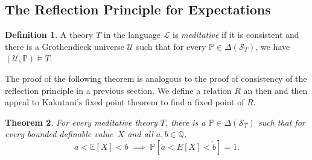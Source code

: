 \documentclass[12pt]{article}
\newcommand{\PP}{\mathbb{P}}
\newcommand{\EE}{\mathbb{E}}
\newcommand{\QQ}{\mathbb{Q}}
\newcommand{\cL}{\mathcal{L}}
\newcommand{\cS}{\mathcal{S}}
\newcommand{\cU}{\mathcal{U}}
\theoremstyle{plain}
\newtheorem{theorem}{Theorem}[subsection]
\theoremstyle{definition}
\newtheorem{definition}[theorem]{Definition}
\theoremstyle{remark}
\begin{document}
\subsection{The Reflection Principle for Expectations}
\begin{definition}
A theory $T$ in the language $\cL$ is \emph{meditative} if it is consistent and there is a Grothendieck universe $\cU$ such that for every $\PP\in\Delta(\cS_T)$, we have $(\cU,\PP)\vDash T$.
\end{definition}
The proof of the following theorem is analogous to the proof of consistency of the reflection principle in a previous section. We define a relation $R$ an then and then appeal to Kakutani's fixed point theorem to find a fixed point of $R$.
\begin{theorem}
For every meditative theory $T$, there is a $\PP\in\Delta(\cS_T)$ such that for every bounded definable value~$X$ and all $a,b\in\QQ$,
\[a<\EE[X]<b\;\implies\;\PP[\dot a < E[X] < \dot b] = 1.\]
\end{theorem}
\end{document}
